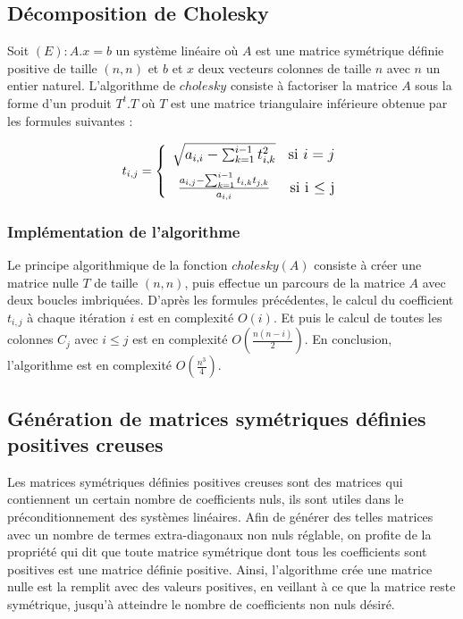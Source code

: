 \documentclass{article}
\begin{document}
\subsection{Décomposition de Cholesky}
Soit $(E) : A.x = b$ un système linéaire où $A$ est une matrice symétrique définie positive de taille $(n,n)$
et $b$ et $x$ deux vecteurs colonnes de taille $n$ avec $n$ un entier naturel.
L'algorithme de $cholesky$ consiste à factoriser la matrice $A$ sous la forme d’un produit $ T^{t}.T$ où $T$
est une matrice triangulaire inférieure obtenue par les formules suivantes :

\[ \large t_{i, j} = \left\{
    \begin{array}{cr}
        \rule{0pt}{2.5ex} \sqrt{ a_{i,i} - \sum_{k=1}^{i-1} t_{i,k}^{2}} & \mbox{si } i=j \\
        \rule{0pt}{4ex} \frac{ \LARGE a_{i,j} - \sum_{k=1}^{i-1} t_{i,k}t_{j,k} } {a_{i,i}}& \mbox{si i $\leq$ j}
    \end{array}
\right.\]
\subsubsection{Implémentation de l'algorithme}
Le principe algorithmique de la fonction $cholesky(A)$ consiste à créer une matrice nulle $T$ de taille $(n,n)$, puis effectue 
un parcours de la matrice $A$ avec deux boucles imbriquées. D'après les formules précédentes, le calcul du coefficient $t_{i,j}$ 
à chaque itération $i$ est en complexité $O(i)$. Et puis le calcul de toutes les colonnes $C_{j}$ avec $i\leq j$ est en complexité 
$O(\frac{n(n-i)}{2})$. En conclusion, l'algorithme est en complexité $O(\frac{n^{3}}{4})$.
\subsection{Génération de matrices symétriques définies positives creuses}
Les matrices symétriques définies positives creuses sont des matrices qui contiennent un certain nombre de coefficients nuls, 
ils sont utiles dans le préconditionnement des systèmes linéaires. Afin de générer des telles matrices avec un nombre de termes 
extra-diagonaux non nuls réglable, on profite de la propriété qui dit que toute matrice symétrique dont tous les coefficients sont 
positives est une matrice définie positive. Ainsi, l'algorithme crée une matrice nulle est la remplit avec des valeurs positives, 
en veillant à ce que la matrice reste symétrique, jusqu'à atteindre le nombre de coefficients non nuls désiré.
\end{document}
